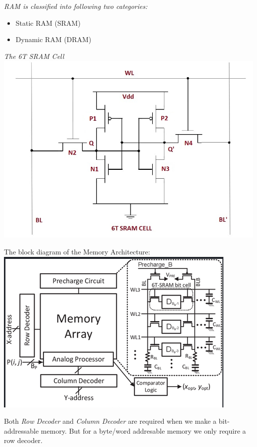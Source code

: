 \documentclass[12pt, letterpaper]{article}
\begin{document}
\emph{RAM is classified into following two categories:}
\begin{itemize}
    \item Static RAM (SRAM)
    \item Dynamic RAM (DRAM)
\end{itemize}

\emph{The 6T SRAM Cell} \\
\includegraphics [scale=0.5]{sram-cell}

The block diagram of the Memory Architecture: \\
\includegraphics[scale=0.7]{det_mem_arch}

Both \emph{Row Decoder} and \emph{Column Decoder} are required when we make a bit-addressable memory.
But for a byte/word addresable memory we only require a row decoder.
\end{document}
